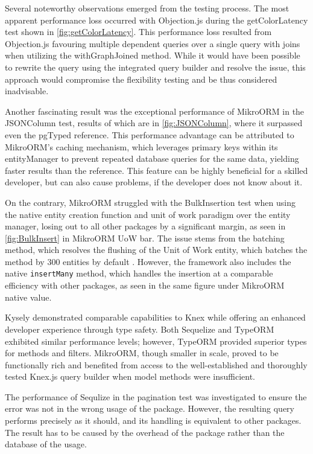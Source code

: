 Several noteworthy observations emerged from the testing process. The most
apparent performance loss occurred with Objection.js during the getColorLatency
test shown in \autoref{fig:getColorLatency}. This performance loss resulted from
Objection.js favouring multiple dependent queries over a single query with joins
when utilizing the withGraphJoined method. While it would have been possible to
rewrite the query using the integrated query builder and resolve the issue, this
approach would compromise the flexibility testing and be thus considered
inadvisable.

Another fascinating result was the exceptional performance of MikroORM in the
JSONColumn test, results of which are in \autoref{fig:JSONColumn}, where it
surpassed even the pgTyped reference. This performance advantage can be
attributed to MikroORM's caching mechanism, which leverages primary keys within
its entityManager to prevent repeated database queries for the same data,
yielding faster results than the reference. This feature can be highly
beneficial for a skilled developer, but can also cause problems, if the
developer does not know about it.

On the contrary, MikroORM struggled with the BulkInsertion test when using the
native entity creation function and unit of work paradigm over the entity
manager, losing out to all other packages by a significant margin, as seen in
\autoref{fig:BulkInsert} in MikroORM UoW bar. The issue stems from the batching
method, which resolves the flushing of the Unit of Work entity, which batches
the method by 300 entities by default \cite{MikroORMBatching}. However, the
framework also includes the native \texttt{insertMany} method, which handles the
insertion at a comparable efficiency with other packages, as seen in the same
figure under MikroORM native value.

Kysely demonstrated comparable capabilities to Knex while offering an enhanced
developer experience through type safety. Both Sequelize and TypeORM exhibited
similar performance levels; however, TypeORM provided superior types for methods
and filters. MikroORM, though smaller in scale, proved to be functionally rich
and benefited from access to the well-established and thoroughly tested Knex.js
query builder when model methods were insufficient.

The performance of Sequlize in the pagination test was investigated to ensure
the error was not in the wrong usage of the package. However, the resulting
query performs precisely as it should, and its handling is equivalent to other
packages. The result has to be caused by the overhead of the package rather than
the database of the usage.


